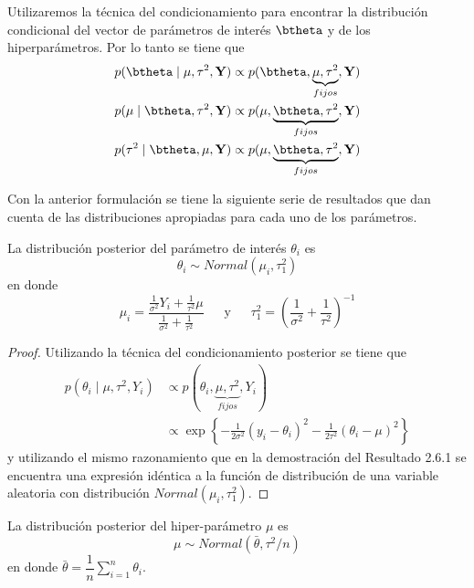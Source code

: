 Utilizaremos la técnica del condicionamiento para encontrar la distribución condicional del vector de parámetros de interés $\btheta$ y de los hiperparámetros. Por lo tanto se tiene que
\begin{align*}
p(\btheta \mid \mu,\tau^2,\mathbf{Y})
&\propto p(\btheta,\underbrace{\mu,\tau^2}_{fijos},\mathbf{Y})\\
p(\mu \mid \btheta,\tau^2,\mathbf{Y})
&\propto p(\mu,\underbrace{\btheta,\tau^2}_{fijos},\mathbf{Y}) \\
p(\tau^2 \mid \btheta,\mu,\mathbf{Y})
&\propto p(\mu,\underbrace{\btheta,\tau^2}_{fijos},\mathbf{Y})
\end{align*}

Con la anterior formulación se tiene la siguiente serie de resultados que dan cuenta de las distribuciones apropiadas para cada uno de los parámetros.

\begin{Res}
La distribución posterior del parámetro de interés $\theta_i$ es
\begin{equation*}
\theta_i\sim Normal(\mu_i,\tau_1^2)
\end{equation*}
en donde
\begin{equation*}
\mu_i=\frac{\frac{1}{\sigma^2}Y_i+\frac{1}{\tau^2}\mu}{\frac{1}{\sigma^2}+\frac{1}{\tau^2}}
\ \ \ \ \ \ \ \text{y} \ \ \ \ \ \ \
\tau_1^2=\left(\frac{1}{\sigma^2}+\frac{1}{\tau^2}\right)^{-1}
\end{equation*}
\end{Res}

\begin{proof}
Utilizando la técnica del condicionamiento posterior se tiene que
\begin{align*}
p(\theta_i \mid \mu,\tau^2,Y_i)
&\propto p(\theta_i,\underbrace{\mu,\tau^2}_{fijos},Y_i)\\
&\propto \exp\left\{-\frac{1}{2\sigma^2}(y_i-\theta_i)^2-\frac{1}{2\tau^2}(\theta_i-\mu)^2\right\}
\end{align*}
y utilizando el mismo razonamiento que en la demostración del Resultado 2.6.1 se encuentra una expresión idéntica a la función de distribución de una variable aleatoria con distribución $Normal(\mu_i,\tau_1^2)$.
\end{proof}

\begin{Res}
La distribución posterior del hiper-parámetro $\mu$ es
\begin{equation*}
\mu\sim Normal(\bar{\theta},\tau^2/n)
\end{equation*}
en donde $\bar{\theta}=\dfrac{1}{n}\sum_{i=1}^n\theta_i$.
\end{Res}

